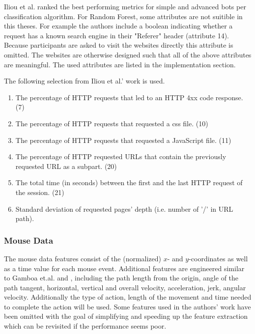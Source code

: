 \documentclass[
    fontsize=12pt,
    headings=small,
    parskip=half,           %
    bibliography=totoc,
    numbers=noenddot,       %
    open=any,               %
    final                   %
]{scrreprt}
\begin{document}
Iliou et al. \cite{10.1145/3339252.3339267} ranked the best performing metrics for simple and advanced bots per classification algorithm. For Random Forest, some attributes are not suitible in this theses. For example the authors include a boolean indicating whether a request has a known search engine in their "Referer" header (attribute 14). Because participants are asked to visit the websites directly this attribute is omitted. The websites are otherwise designed such that all of the above attributes are meaningful. The used attributes are listed in the implementation section.

The following selection from Iliou et al.' work \cite{10.1145/3339252.3339267} is used.

\begin{enumerate}
	\item The percentage of HTTP requests that led to an HTTP 4xx code response. (7)
	\item The percentage of HTTP requests that requested a css file. (10)
	\item The percentage of HTTP requests that requested a JavaScript file. (11)
	\item The percentage of HTTP requested URLs that contain the previously requested URL as a subpart. (20)
	\item The total time (in seconds) between the first and the last HTTP request of the session. (21)
	\item Standard deviation of requested pages' depth (i.e. number of ’/’ in URL path).
\end{enumerate}

\label{concept_mouse_data}
\subsubsection{Mouse Data}

The mouse data features consist of the (normalized) $x$- and $y$-coordinates as well as a time value for each mouse event. Additional features are engineered similar to Gamboa et.al.\cite{GAMBOA2004} and \cite{https://doi.org/10.1049/iet-bmt.2018.5126}, including the path length from the origin, angle of the path tangent, horizontal, vertical and overall velocity, acceleration, jerk, angular velocity. Additionally the type of action, length of the movement and time needed to complete the action will be used. Some features used in the authors' work have been omitted with the goal of simplifying and speeding up the feature extraction which can be revisited if the performance seems poor.
\end{document}

